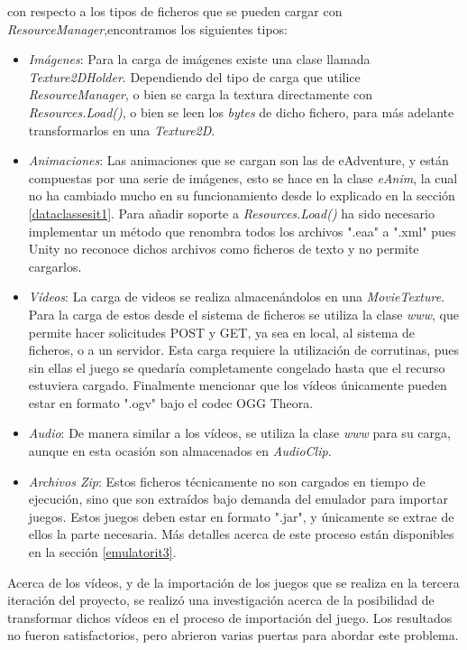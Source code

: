 con respecto a los tipos de ficheros que se pueden cargar con \textit{ResourceManager},encontramos los siguientes tipos:
\begin{itemize}
	\item \textit{Imágenes}: Para la carga de imágenes existe una clase llamada \textit{Texture2DHolder}. Dependiendo del tipo de carga que utilice \textit{ResourceManager}, o bien se carga la textura directamente con \textit{Resources.Load()}, o bien se leen los \textit{bytes} de dicho fichero, para más adelante transformarlos en una \textit{Texture2D}.
	
	\item \textit{Animaciones}: Las animaciones que se cargan son las de eAdventure, y están compuestas por una serie de imágenes, esto se hace en la clase \textit{eAnim}, la cual no ha cambiado mucho en su funcionamiento desde lo explicado en la sección \ref{dataclassesit1}. Para añadir soporte a \textit{Resources.Load()} ha sido necesario implementar un método que renombra todos los archivos ".eaa" a ".xml" pues Unity no reconoce dichos archivos como ficheros de texto y no permite cargarlos.
	
	\item \textit{Vídeos}: La carga de videos se realiza almacenándolos en una \textit{MovieTexture}. Para la carga de estos desde el sistema de ficheros se utiliza la clase \textit{www}, que permite hacer solicitudes POST y GET, ya sea en local, al sistema de ficheros, o a un servidor. Esta carga requiere la utilización de corrutinas, pues sin ellas el juego se quedaría completamente congelado hasta que el recurso estuviera cargado. Finalmente mencionar que los vídeos únicamente pueden estar en formato ".ogv" bajo el codec OGG Theora.
	
	\item \textit{Audio}: De manera similar a los vídeos, se utiliza la clase \textit{www} para su carga, aunque en esta ocasión son almacenados en \textit{AudioClip}.
	
	\item \textit{Archivos Zip}: Estos ficheros técnicamente no son cargados en tiempo de ejecución, sino que son extraídos bajo demanda del emulador para importar juegos. Estos juegos deben estar en formato ".jar", y únicamente se extrae de ellos la parte necesaria. Más detalles acerca de este proceso están disponibles en la sección \ref{emulatorit3}.
\end{itemize}

Acerca de los vídeos, y de la importación de los juegos que se realiza en la tercera iteración del proyecto, se realizó una investigación acerca de la posibilidad de transformar dichos vídeos en el proceso de importación del juego. Los resultados no fueron satisfactorios, pero abrieron varias puertas para abordar este problema.

